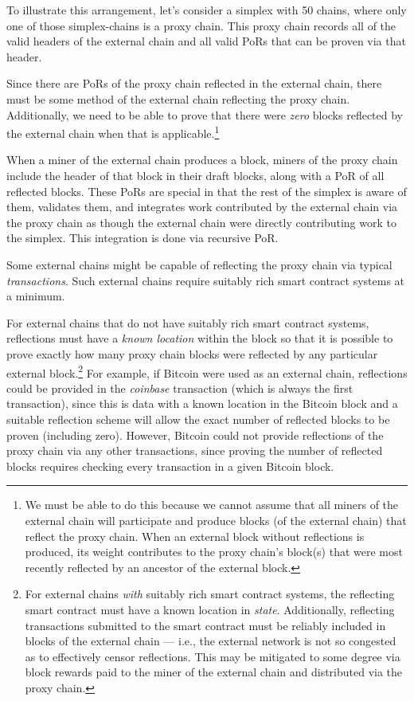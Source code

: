 \documentclass[a4paper,]{article}
\begin{document}
To illustrate this arrangement, let's consider a simplex with 50 chains, where only one of those simplex-chains is a proxy chain.
This proxy chain records all of the valid headers of the external chain and all valid PoRs that can be proven via that header.

Since there are PoRs of the proxy chain reflected in the external chain, there must be some method of the external chain reflecting the proxy chain.
Additionally, we need to be able to prove that there were \emph{zero} blocks reflected by the external chain when that is applicable.\footnote{
  We must be able to do this because we cannot assume that all miners of the external chain will participate and produce blocks (of the external chain) that reflect the proxy chain.
  When an external block without reflections is produced, its weight contributes to the proxy chain's block(s) that were most recently reflected by an ancestor of the external block.
}

When a miner of the external chain produces a block, miners of the proxy chain include the header of that block in their draft blocks, along with a PoR of all reflected blocks.
These PoRs are special in that the rest of the simplex is aware of them, validates them, and integrates work contributed by the external chain via the proxy chain as though the external chain were directly contributing work to the simplex.
This integration is done via recursive PoR.

Some external chains might be capable of reflecting the proxy chain via typical \emph{transactions}.
Such external chains require suitably rich smart contract systems at a minimum.

For external chains that do not have suitably rich smart contract systems, reflections must have a \emph{known location} within the block so that it is possible to prove exactly how many proxy chain blocks were reflected by any particular external block.\footnote{
  For external chains \emph{with} suitably rich smart contract systems, the reflecting smart contract must have a known location in \emph{state}.
  Additionally, reflecting transactions submitted to the smart contract must be reliably included in blocks of the external chain --- i.e., the external network is not so congested as to effectively censor reflections.
  This may be mitigated to some degree via block rewards paid to the miner of the external chain and distributed via the proxy chain.
}
For example, if Bitcoin were used as an external chain, reflections could be provided in the \emph{coinbase} transaction (which is always the first transaction), since this is data with a known location in the Bitcoin block and a suitable reflection scheme will allow the exact number of reflected blocks to be proven (including zero).
However, Bitcoin could not provide reflections of the proxy chain via any other transactions, since proving the number of reflected blocks requires checking every transaction in a given Bitcoin block.
\end{document}
